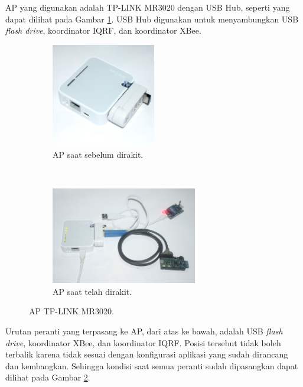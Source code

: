 			AP yang digunakan adalah TP-LINK MR3020 dengan USB Hub, seperti yang dapat dilihat pada Gambar \ref{ap-stripped}. USB Hub digunakan untuk menyambungkan USB \emph{flash drive}, koordinator IQRF, dan koordinator XBee.

			\begin{figure}[H]
				\begin{subfigure}[b]{\textwidth}
					\centering
				    \includegraphics[width=0.5\textwidth]{gambar/ap-stripped}
				    \caption{AP saat sebelum dirakit.}
				    \label{ap-stripped}
				\end{subfigure}
				 ~
				\begin{subfigure}[b]{\textwidth}
					\centering
				    \includegraphics[width=0.7\textwidth]{gambar/ap-complete}
				    \caption{AP saat telah dirakit.}
				    \label{ap-complete}
				\end{subfigure}
				\caption{AP TP-LINK MR3020.}
				\label{ap}
			\end{figure}

			Urutan peranti yang terpasang ke AP, dari atas ke bawah, adalah USB \emph{flash drive}, koordinator XBee, dan koordinator IQRF. Posisi tersebut tidak boleh terbalik karena tidak sesuai dengan konfigurasi aplikasi yang sudah dirancang dan kembangkan. Sehingga kondisi saat semua peranti sudah dipasangkan dapat dilihat pada Gambar \ref{ap-complete}.

